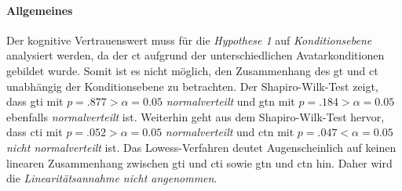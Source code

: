 \documentclass[a4paper,11pt]{article}%
\renewcommand{\\}{\vspace*{0.5\baselineskip} \newline}
\begin{document}
\paragraph{Allgemeines}
Der kognitive Vertrauenswert muss für die \textit{Hypothese 1} auf \textit{Konditionsebene} analysiert werden, da der \ac{ct} aufgrund der unterschiedlichen Avatarkonditionen gebildet wurde. Somit ist es nicht möglich, den Zusammenhang des \ac{gt} und \ac{ct} unabhängig der Konditionsebene zu betrachten.
Der Shapiro-Wilk-Test zeigt, dass \ac{gti} mit  $p = .877 > \alpha = 0.05$ \textit{normalverteilt} und \ac{gtn} mit $p = .184 > \alpha = 0.05$ ebenfalls \textit{normalverteilt} ist. \\
Weiterhin geht aus dem Shapiro-Wilk-Test hervor, dass \ac{cti} mit  $p = .052 > \alpha = 0.05$ \textit{normalverteilt} und \ac{ctn} mit $p = .047 < \alpha = 0.05$ \textit{nicht normalverteilt} ist.
Das Lowess-Verfahren deutet Augenscheinlich auf keinen linearen Zusammenhang zwischen \ac{gti} und \ac{cti} sowie \ac{gtn} und \ac{ctn} hin. Daher wird die \textit{Linearitätsannahme nicht angenommen}.
\end{document}

